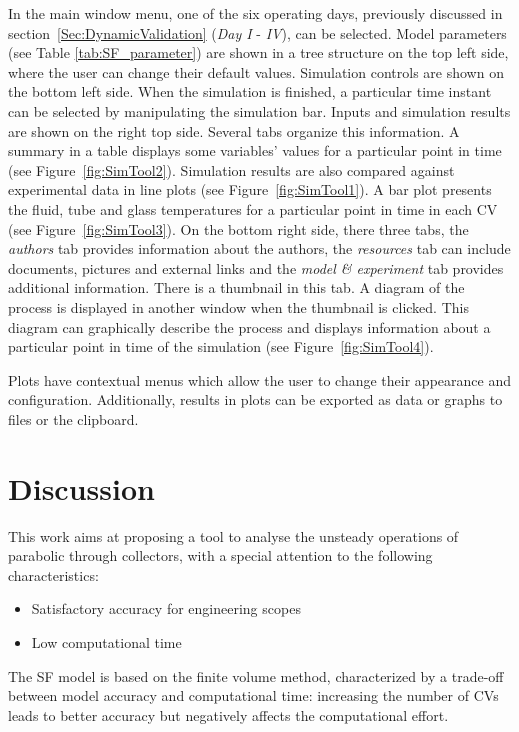\documentclass[final,3p,times,review]{elsarticle}
\begin{document}
In the main window menu, one of the six operating days, previously discussed in section~\ref{Sec:DynamicValidation} (\textit{Day I} - \textit{IV}), can be selected. Model parameters (see Table \ref{tab:SF_parameter}) are shown in a tree structure on the top left side, where the user can change their default values. Simulation controls are shown on the bottom left side. When the simulation is finished, a particular time instant can be selected by manipulating the simulation bar. Inputs and simulation results are shown on the right top side. Several tabs organize this information. A summary in a table displays some variables' values for a particular point in time (see Figure~\ref{fig:SimTool2}). Simulation results are also compared against experimental data in line plots (see Figure~\ref{fig:SimTool1}). A bar plot presents the fluid, tube and glass temperatures for a particular point in time in each CV (see Figure~\ref{fig:SimTool3}). On the bottom right side, there three tabs, the \textit{authors} tab provides information about the authors, the \textit{resources} tab can include documents, pictures and external links and the \textit{model \& experiment} tab provides additional information. There is a thumbnail in this tab. A diagram of the process is displayed in another window when the thumbnail is clicked. This diagram can graphically describe the process and displays information about a particular point in time of the simulation (see Figure~\ref{fig:SimTool4}).

Plots have contextual menus which allow the user to change their appearance and configuration. Additionally, results in plots can be exported as data or graphs to files or the clipboard.

%
\section{Discussion} \label{Sec:Disccusion}
%
This work aims at proposing a tool to analyse the unsteady operations of parabolic through collectors, with a special
attention to the following characteristics:
%
\begin{itemize}
	\item Satisfactory accuracy for engineering scopes
	\item Low computational time
\end{itemize}
%
The SF model is based on the finite volume method, characterized by a trade-off between model accuracy and computational time: increasing the number of CVs leads to better accuracy but negatively affects
the computational effort.
\end{document}
